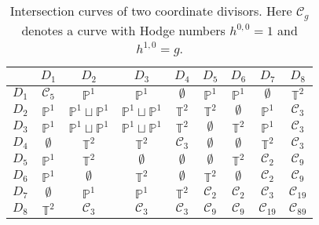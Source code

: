 \documentclass[11pt,a4paper]{article}
\newcommand{\T}{\mathbb{T}}
\newcommand{\mP}{\mathbb{P}}
\newcommand{\mc}{\mathcal}
\begin{document}
\begin{table}[H]
  \centering
 \begin{tabular}{|c||c|c|c|c|c|c|c|c|}
\hline
 & $D_1$ & $D_2$ & $D_3$ & $D_4$ & $D_5$ & $D_6$ & $D_7$ & $D_8$   \\
 \hline
 $D_1$ & $\mc{C}_5$  & $\mP^1$             & $\mP^1$             & $\emptyset$ & $\mP^1$     & $\mP^1$     & $\emptyset$   & $\T^2$ \\
 $D_2$ & $\mP^1$     & $\mP^1\sqcup \mP^1$ & $\mP^1\sqcup \mP^1$ & $\T^2$      & $\T^2$      & $\emptyset$ & $\mP^1$       & $\mc{C}_3$ \\
 $D_3$ & $\mP^1$     & $\mP^1\sqcup \mP^1$ & $\mP^1\sqcup \mP^1$ & $\T^2$      & $\emptyset$ & $\T^2$      & $\mP^1$       & $\mc{C}_3$ \\
 $D_4$ & $\emptyset$ & $\T^2$              & $\T^2$              & $\mc{C}_3$  & $\emptyset$ & $\emptyset$ & $\T^2$        & $\mc{C}_3$ \\
 $D_5$ & $\mP^1$     & $\T^2$              & $\emptyset$         & $\emptyset$ & $\emptyset$ & $\T^2$      & $\mc{C}_2$    & $\mc{C}_9$ \\
 $D_6$ & $\mP^1$     & $\emptyset$         & $\T^2$              & $\emptyset$ & $\T^2$      & $\emptyset$ & $\mc{C}_2$    & $\mc{C}_9$ \\
 $D_7$ & $\emptyset$ & $\mP^1$             & $\mP^1$             & $\T^2$      & $\mc{C}_2$  & $\mc{C}_2$  & $\mc{C}_3$    & $\mc{C}_{19}$ \\
 $D_8$ & $\T^2$      & $\mc{C}_3$          & $\mc{C}_3$          & $\mc{C}_3$  & $\mc{C}_9$  & $\mc{C}_9$  & $\mc{C}_{19}$ & $\mc{C}_{89}$ \\
 \hline
 \end{tabular}
 \caption{Intersection curves of two coordinate divisors. Here $\mc{C}_g$ denotes a curve with Hodge numbers $h^{0,0} = 1$ and $h^{1,0} = g$.}
 \label{TabIntB}
 \end{table}
 
\end{document}
